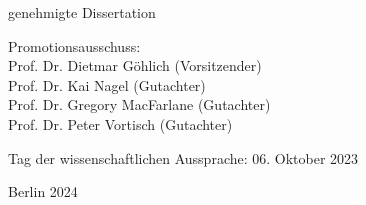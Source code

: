 \begin{flushright}
	genehmigte Dissertation

	\hrulefill

	\vspace{3mm}
	Promotionsausschuss:\\
	Prof. Dr. Dietmar Göhlich (Vorsitzender)\\
	Prof. Dr. Kai Nagel (Gutachter)\\
	Prof. Dr. Gregory MacFarlane (Gutachter)\\
	Prof. Dr. Peter Vortisch (Gutachter)\\
	\vspace{5mm}

	Tag der wissenschaftlichen Aussprache: 06. Oktober 2023\\

	\vspace{5mm}

	Berlin 2024\\

\end{flushright}